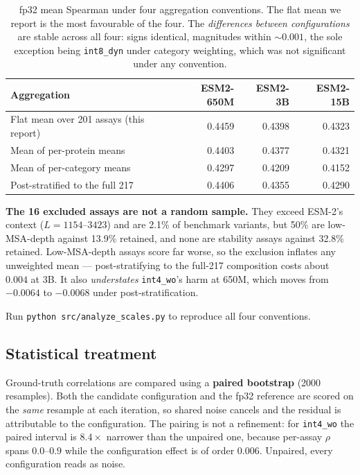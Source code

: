 \documentclass[11pt]{article}
\newcommand{\cfg}[1]{\texttt{#1}}
\begin{document}
\begin{table}[htb]
\centering
\caption{fp32 mean Spearman under four aggregation conventions. The flat mean we
report is the most favourable of the four. The \emph{differences between
configurations} are stable across all four: signs identical, magnitudes within
$\sim$$0.001$, the sole exception being \cfg{int8\_dyn} under category weighting,
which was not significant under any convention.}
\label{tab:agg}
\small
\begin{tabular}{lrrr}
\toprule
Aggregation & ESM2-650M & ESM2-3B & ESM2-15B \\
\midrule
Flat mean over 201 assays (this report) & 0.4459 & 0.4398 & 0.4323 \\
Mean of per-protein means               & 0.4403 & 0.4377 & 0.4321 \\
Mean of per-category means              & 0.4297 & 0.4209 & 0.4152 \\
Post-stratified to the full 217         & 0.4406 & 0.4355 & 0.4290 \\
\bottomrule
\end{tabular}
\end{table}

\textbf{The 16 excluded assays are not a random sample.} They exceed ESM-2's
context ($L = 1154$--$3423$) and are 2.1\% of benchmark variants, but 50\% are
low-MSA-depth against 13.9\% retained, and none are stability assays against
32.8\% retained. Low-MSA-depth assays score far worse, so the exclusion inflates
any unweighted mean --- post-stratifying to the full-217 composition costs about
$0.004$ at 3B. It also \emph{understates} \cfg{int4\_wo}'s harm at 650M, which
moves from $-0.0064$ to $-0.0068$ under post-stratification.

Run \texttt{python src/analyze\_scales.py} to reproduce all four conventions.

\subsection{Statistical treatment}

Ground-truth correlations are compared using a \textbf{paired bootstrap} (2000
resamples). Both the candidate configuration and the fp32 reference are scored
on the \emph{same} resample at each iteration, so shared noise cancels and the
residual is attributable to the configuration. The pairing is not a refinement:
for \cfg{int4\_wo} the paired interval is $8.4\times$ narrower than the unpaired
one, because per-assay $\rho$ spans $0.0$--$0.9$ while the configuration effect is
of order $0.006$. Unpaired, every configuration reads as noise.
\end{document}
